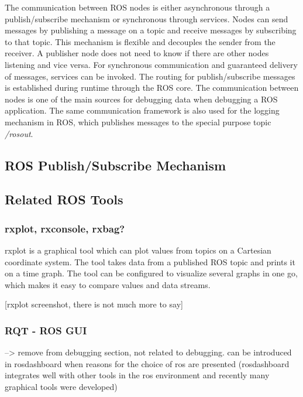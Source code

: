 The communication between ROS nodes is either asynchronous through a publish/subscribe mechanism or synchronous through services. Nodes can send messages by publishing a message on a topic and receive messages by subscribing to that topic. This mechanism is flexible and decouples the sender from the receiver. A publisher node does not need to know if there are other nodes listening and vice versa. For synchronous communication and guaranteed delivery of messages, services can be invoked. The routing for publish/subscribe messages is established during runtime through the ROS core. The communication between nodes is one of the main sources for debugging data when debugging a ROS application. The same communication framework is also used for the logging mechanism in ROS, which publishes messages to the special purpose topic \emph{/rosout}.




\subsection{ROS Publish/Subscribe Mechanism}

\subsection{Related ROS Tools}

\subsubsection{rxplot, rxconsole, rxbag?}
rxplot is a graphical tool which can plot values from topics on a Cartesian coordinate system. The tool takes data from a published ROS topic and prints it on a time graph. The tool can be configured to visualize several graphs in one go, which makes it easy to compare values and data streams.

[rxplot screenshot, there is not much more to say]

\subsubsection{RQT - ROS GUI}
--> remove from debugging section, not related to debugging. can be introduced in rosdashboard when reasons for the choice of ros are presented (rosdashboard integrates well with other tools in the ros environment and recently many graphical tools were developed)

